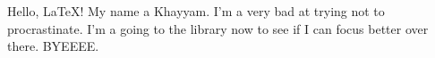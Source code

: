 \documentclass{article}
\begin{document}
    Hello, \LaTeX!
    My name a Khayyam.  I'm a very bad at trying not to procrastinate.
    I'm a going to the library now to see if I can focus better over there. BYEEEE.
\end{document}
